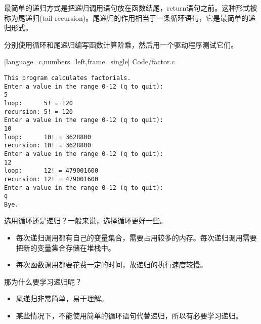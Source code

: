 \begin{frame}[fragile]
最简单的递归方式是\textcolor{acolor1}{把递归调用语句放在函数结尾，return语句之前。}这种形式被称为\textcolor{acolor1}{尾递归(tail recursion)}。尾递归的作用相当于一条循环语句，它是最简单的递归形式。
\end{frame}

\begin{frame}[fragile]
分别使用循环和尾递归编写函数计算阶乘，然后用一个驱动程序测试它们。
\end{frame}

\begin{frame}
  
  [language=c,numbers=left,frame=single]
  {Code/factor.c}
\end{frame}


\begin{frame}[fragile]
\begin{lstlisting}
This program calculates factorials.
Enter a value in the range 0-12 (q to quit):
5
loop:      5! = 120
recursion: 5! = 120
Enter a value in the range 0-12 (q to quit):
10
loop:      10! = 3628800
recursion: 10! = 3628800
Enter a value in the range 0-12 (q to quit):
12
loop:      12! = 479001600
recursion: 12! = 479001600
Enter a value in the range 0-12 (q to quit):
q
Bye.
\end{lstlisting}
\end{frame}

\begin{frame}[fragile]
{\Large 选用循环还是递归？}\pause 一般来说，选择循环更好一些。
\pause
\vspace{0.1in}

\begin{itemize}
\item 每次递归调用都有自己的变量集合，需要占用较多的内存。每次递归调用需要把新的变量集合存储在堆栈中。\\[0.1in]
\item 每次函数调用都要花费一定的时间，故递归的执行速度较慢。
\end{itemize}
\end{frame}

\begin{frame}[fragile]
{\Large 那为什么要学习递归呢？}\pause 
\vspace{0.1in}

\begin{itemize}
\item 尾递归非常简单，易于理解。\\[0.1in]
\item 某些情况下，不能使用简单的循环语句代替递归，所以有必要学习递归。
\end{itemize}

\end{frame}

